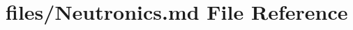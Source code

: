 \hypertarget{Neutronics_8md}{}\section{files/\+Neutronics.md File Reference}
\label{Neutronics_8md}
